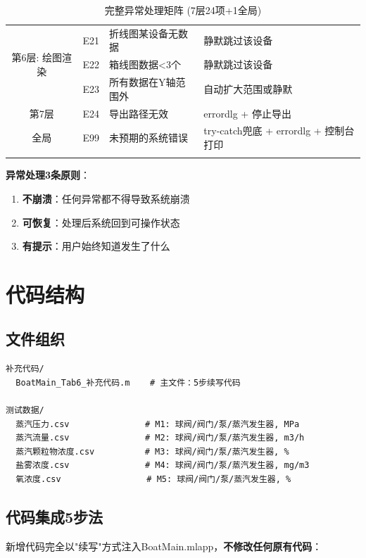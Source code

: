 \documentclass[12pt,a3paper]{ctexart}
\begin{document}
\begin{longtable}{c|l|l|l}
\multirow{3}{*}{第6层: 绘图渲染}
& E21 & 折线图某设备无数据 & 静默跳过该设备 \\
& E22 & 箱线图数据<3个 & 静默跳过该设备 \\
& E23 & 所有数据在Y轴范围外 & 自动扩大范围或静默 \\
\hline

第7层 & E24 & 导出路径无效 & errordlg + 停止导出 \\
\hline
全局 & E99 & 未预期的系统错误 & try-catch兜底 + errordlg + 控制台打印 \\
\bottomrule
\caption{完整异常处理矩阵 (7层24项+1全局)}
\end{longtable}

\textbf{异常处理3条原则}：
\begin{enumerate}
    \item \textbf{不崩溃}：任何异常都不得导致系统崩溃
    \item \textbf{可恢复}：处理后系统回到可操作状态
    \item \textbf{有提示}：用户始终知道发生了什么
\end{enumerate}

\section{代码结构}

\subsection{文件组织}

\begin{verbatim}
补充代码/
  BoatMain_Tab6_补充代码.m    # 主文件：5步续写代码

测试数据/
  蒸汽压力.csv               # M1: 球阀/阀门/泵/蒸汽发生器, MPa
  蒸汽流量.csv               # M2: 球阀/阀门/泵/蒸汽发生器, m3/h
  蒸汽颗粒物浓度.csv          # M3: 球阀/阀门/泵/蒸汽发生器, %
  盐雾浓度.csv               # M4: 球阀/阀门/泵/蒸汽发生器, mg/m3
  氧浓度.csv                 # M5: 球阀/阀门/泵/蒸汽发生器, %
\end{verbatim}

\subsection{代码集成5步法}

新增代码完全以"续写"方式注入BoatMain.mlapp，\textbf{不修改任何原有代码}：
\end{document}

